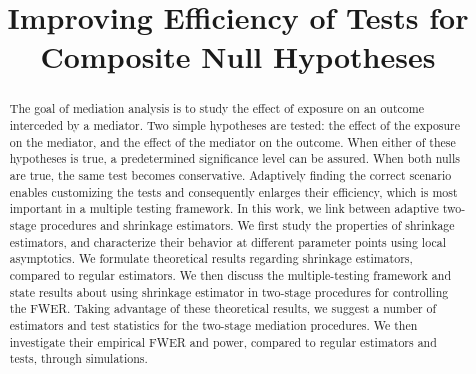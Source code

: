 \documentclass[ejs, twoside]{imsart}
\theoremstyle{plain}
\theoremstyle{remark}
\numberwithin{equation}{section}
\numberwithin{table}{section}
\numberwithin{figure}{section}
\begin{document}
\begin{frontmatter}

\title{Improving Efficiency of Tests for Composite Null Hypotheses}%


\author{
	   \and{}
	  
}
\address{
	Faculty of Industrial Engineering and Management,\\
	Technion---Israel Institute of Technology, Israel\\
}


\begin{abstract}
The goal of mediation analysis is to study the effect of exposure on an outcome interceded by a mediator. Two simple hypotheses are tested: the effect of the exposure on the mediator, and the effect of the mediator on the outcome. 
When either of these hypotheses is true, a predetermined significance level can be assured. When both nulls are true, the same test becomes conservative. Adaptively finding the correct scenario enables customizing the tests and consequently enlarges their efficiency, which is most important in a multiple testing framework.  In this work, we link between adaptive two-stage procedures and shrinkage estimators. We first study the properties of shrinkage estimators, and characterize their behavior at different parameter points using local asymptotics. We formulate theoretical results regarding shrinkage estimators, compared to regular estimators. We then discuss the multiple-testing framework and state results about using shrinkage estimator in  two-stage procedures for controlling the FWER. Taking advantage of these theoretical results, we suggest a number of estimators and test statistics for the two-stage mediation procedures. We then investigate their empirical FWER and power, compared to regular estimators and tests, through simulations. \end{abstract}



\end{frontmatter}
\end{document}
